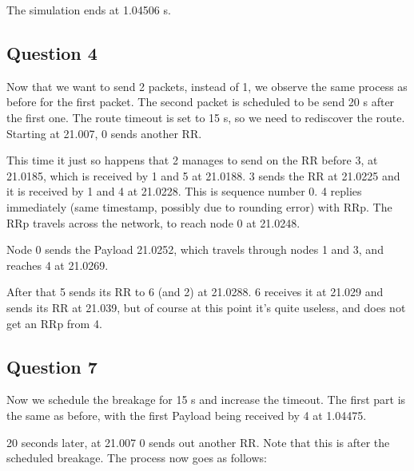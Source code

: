 \documentclass[11pt,journal]{article}
\begin{document}
	The simulation ends at 1.04506 s.

	\subsection{Question 4}
	Now that we want to send 2 packets, instead of 1, we observe the same process as before for the first packet. The second packet is scheduled to be send 20 s after the first one. The route timeout is set to 15 s, so we need to rediscover the route. Starting at 21.007, 0 sends another RR.
	
	This time it just so happens that 2 manages to send on the RR before 3, at 21.0185, which is received by 1 and 5 at 21.0188. 3 sends the RR at 21.0225 and it is received by 1 and 4 at 21.0228. This is sequence number 0. 4 replies immediately (same timestamp, possibly due to rounding error) with RRp. The RRp travels across the network, to reach node 0 at 21.0248.
	
	Node 0 sends the Payload 21.0252, which travels through nodes 1 and 3, and reaches 4 at 21.0269.
	
	After that 5 sends its RR to 6 (and 2) at 21.0288. 6 receives it at 21.029 and sends its RR at 21.039, but of course at this point it's quite useless, and does not get an RRp from 4.
	
	\subsection{Question 7}
	Now we schedule the breakage for 15 s and increase the timeout. The first part is the same as before, with the first Payload being received by 4 at 1.04475.
	
	20 seconds later, at 21.007 0 sends out another RR. Note that this is after the scheduled breakage. The process now goes as follows:
	
\end{document}
